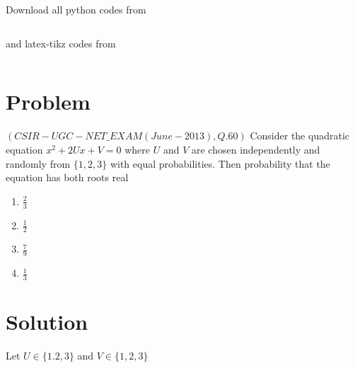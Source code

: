 \documentclass[journal,12pt,twocolumn]{IEEEtran}
\begin{document}
Download all python codes from 
\begin{lstlisting}

\end{lstlisting}

and latex-tikz codes from
\begin{lstlisting}

\end{lstlisting}

\section{Problem}

$(CSIR-UGC-NET\_EXAM(June-2013), Q.60)$ Consider the quadratic equation $x^2+2U x+V=0$ where $U$ and $V$ are chosen independently and randomly from $\{1,2,3\}$ with equal probabilities. Then probability that the equation has both roots real
\begin{multicols}{4}
\begin{enumerate}
    \item $\frac{2}{3}$
    \item $\frac{1}{2}$
    \item $\frac{7}{9}$
    \item $\frac{1}{3}$
\end{enumerate}
\end{multicols}

\section{Solution}

Let $U\in\{1.2,3\}$ and $V\in\{1,2,3\}$
\begin{table}[h!]
\centering
\caption{Probability of selecting values for $U$}
\label{Table1}
\end{table}
\begin{table}[h!]
\centering
\caption{Probability of selecting values for $V$}
\label{Table2}
\end{table}
\end{document}
